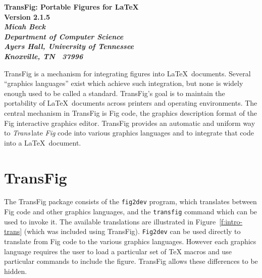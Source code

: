 %


%
\newcommand{\version}{2.1.5}
%
\cfoot{\small Version \version}
%
\newcommand{\DVI}{{\sc dvi}}
\newcommand{\EPIC}{{\sc epic}}
\newcommand{\EEPIC}{{\sc eepic}}
\newcommand{\FTP}{{\tt FTP}}
\newcommand{\PIC}{{\sc pic}}
\newcommand{\PS}{{\sc ps}}
\newcommand{\psfig}{{\bf psfig}}
\newcommand{\PicTeX}{{PiC\TeX}}
\newcommand{\TFX}{{\sc tfx}}
\newcommand{\tpic}{{\tt tpic}}
\newcommand{\textyl}{{\TeX{tyl}}}
%


\begin{center}

\Large	\bf	TransFig: Portable Figures for \LaTeX\ \\
	\rm	Version \version \\[0.15in]

\large	\it	Micah Beck \\

\rm		Department of Computer Science \\
		Ayers Hall, University of Tennessee \\
		Knoxville, TN  ~37996 \\[0.15in]
\end{center}

TransFig is a mechanism for integrating figures into \LaTeX\ documents.
Several ``graphics languages'' exist which achieve such integration,
	but none is widely enough used to be called a standard.
TransFig's goal is to maintain the portability of \LaTeX\ documents across
	printers and operating environments.
The central mechanism in TransFig is Fig code,
	the graphics description format of the Fig interactive graphics editor.
TransFig provides an automatic and uniform way to
	{\it Trans}\,late {\it Fig} code into various graphics languages and
	to integrate that code into a \LaTeX\ document.

\section{TransFig}
The TransFig package consists of the {\tt fig2dev} program,
	which translates between Fig code and other graphics languages,
	and the {\tt transfig} command which can be used to invoke it.
The available translations are illustrated in Figure~\ref{f:intro-trans}
	(which was included using TransFig).
{\tt Fig2dev} can be used directly to translate from Fig code to
	the various graphics languages.
However each graphics language requires the user to load a particular set of
	TeX macros and use particular commands to include the figure.
TransFig allows these differences to be hidden.

